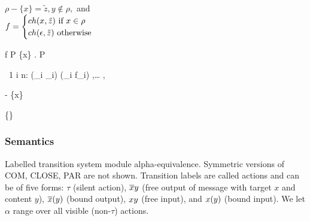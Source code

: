   {}

  {\begin{varwidth}{6cm}
    $ \rho - \{x\} = \tilde{z}, y \notin \rho,$ and \\
    $ f =
      \begin{cases}
        ch(x, \tilde{z}) \text{ if } x \in \rho \\
        ch(\epsilon, \tilde{z}) \text{ otherwise }
      \end{cases} $
   \end{varwidth}}
  {\judgement
    {\rho}
    {f}
    {P}}
  {\judgement
    {\{x\} \cup {}}
    {}
    { . P}}

  {\forall\ 1 \leq i \leq n:
    }
  {\judgement
    {(\cup_i \rho_i)}
    {(\oplus_i f_i)}
    {
      {
      ,\ldots
      ,}}}

  {}
  {}
  {}

  {}
  {\judgement
    {\rho - \{x\}}
    {}
    {}}

  {\judgement
    {\{\}}
    {}
    {}}




\subsubsection{Semantics}

Labelled transition system module alpha-equivalence.
Symmetric versions of COM, CLOSE, PAR are not shown.
Transition labels are called actions and can be of five forms:
$\tau$ (silent action),
$\overline{x}y$ (free output of message with target $x$ and content $y$),
$\overline{x}(y)$ (bound output),
$xy$ (free input),
and $x(y)$ (bound input).
We let $\alpha$ range over all visible (non-$\tau$) actions.

  {  \anullproc}

